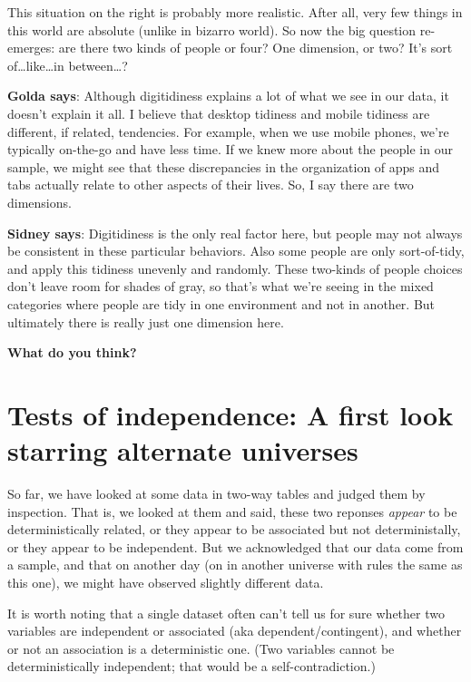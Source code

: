 \documentclass[openany]{book}
\begin{document}
This situation on the right is probably more realistic. After all, very few things in this world are absolute (unlike in bizarro world). So now the big question re-emerges: are there two kinds of people or four? One dimension, or two? It's sort of\ldots{}like\ldots{}in between\ldots{}?

\textbf{Golda says}: Although digitidiness explains a lot of what we see in our data, it doesn't explain it all. I believe that desktop tidiness and mobile tidiness are different, if related, tendencies. For example, when we use mobile phones, we're typically on-the-go and have less time. If we knew more about the people in our sample, we might see that these discrepancies in the organization of apps and tabs actually relate to other aspects of their lives. So, I say there are two dimensions.

\textbf{Sidney says}: Digitidiness is the only real factor here, but people may not always be consistent in these particular behaviors. Also some people are only sort-of-tidy, and apply this tidiness unevenly and randomly. These two-kinds of people choices don't leave room for shades of gray, so that's what we're seeing in the mixed categories where people are tidy in one environment and not in another. But ultimately there is really just one dimension here.

\textbf{What do you think?}

\hypertarget{test-indep}{%
\chapter{Tests of independence: A first look starring alternate universes}\label{test-indep}}

So far, we have looked at some data in two-way tables and judged them by inspection. That is, we looked at them and said, these two reponses \emph{appear} to be deterministically related, or they appear to be associated but not deterministally, or they appear to be independent. But we acknowledged that our data come from a sample, and that on another day (on in another universe with rules the same as this one), we might have observed slightly different data.

It is worth noting that a single dataset often can't tell us for sure whether two variables are independent or associated (aka dependent/contingent), and whether or not an association is a deterministic one. (Two variables cannot be deterministically independent; that would be a self-contradiction.)
\end{document}
